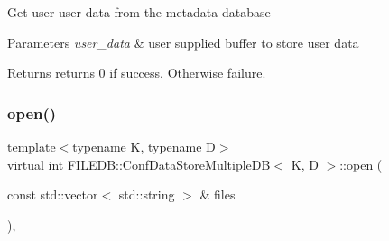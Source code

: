 Get user user data from the metadata database


\begin{DoxyParams}{Parameters}
{\em user\+\_\+data} & user supplied buffer to store user data \\
\hline
\end{DoxyParams}
\begin{DoxyReturn}{Returns}
returns 0 if success. Otherwise failure. 
\end{DoxyReturn}
\mbox{\label{classFILEDB_1_1ConfDataStoreMultipleDB_a3370c2f938d91e2352815aa45637b46d}} 
\subsubsection{\texorpdfstring{open()}{open()}\hspace{0.1cm}{\footnotesize\ttfamily [1/2]}}
{\footnotesize\ttfamily template$<$typename K, typename D$>$ \\
virtual int \mbox{\hyperlink{classFILEDB_1_1ConfDataStoreMultipleDB}{F\+I\+L\+E\+D\+B\+::\+Conf\+Data\+Store\+Multiple\+DB}}$<$ K, D $>$\+::open (\begin{DoxyParamCaption}\item[{const std\+::vector$<$ std\+::string $>$ \&}]{files }\end{DoxyParamCaption})\hspace{0.3cm}{\ttfamily [inline]}, {\ttfamily [virtual]}}

